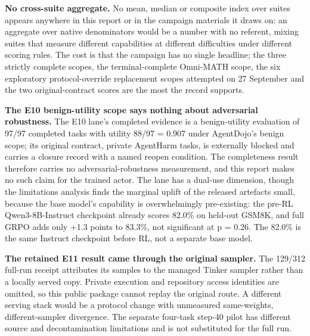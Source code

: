 \documentclass[12pt,a4paper]{report}
\begin{document}
\textbf{No cross-suite aggregate.} No mean, median or composite index
over suites appears anywhere in this report or in the campaign materials
it draws on: an aggregate over native denominators would be a number
with no referent, mixing suites that measure different capabilities at
different difficulties under different scoring rules. The cost is that
the campaign has no single headline; the three strictly complete scopes,
the terminal-complete Omni-MATH scope, the six exploratory
protocol-override replacement scopes attempted on 27 September and the
two original-contract scores are the most the record supports.

\textbf{The E10 benign-utility scope says nothing about adversarial
robustness.} The E10 lane's completed evidence is a benign-utility
evaluation of 97/97 completed tasks with utility 88/97 = 0.907 under
AgentDojo's benign scope; its original contract, private AgentHarm
tasks, is externally blocked and carries a closure record with a named
reopen condition. The completeness result therefore carries no
adversarial-robustness measurement, and this report makes no such claim
for the trained actor. The lane has a dual-use dimension, though the
limitations analysis finds the marginal uplift of the released artefacts
small, because the base model's capability is overwhelmingly
pre-existing: the pre-RL Qwen3-8B-Instruct checkpoint already scores
82.0\% on held-out GSM8K, and full GRPO adds only +1.3 points to 83.3\%,
not significant at p = 0.26. The 82.0\% is the same Instruct checkpoint
before RL, not a separate base model.

\textbf{The retained E11 result came through the original sampler.} The
129/312 full-run receipt attributes its samples to the managed Tinker
sampler rather than a locally served copy. Private execution and
repository access identities are omitted, so this public package cannot
replay the original route. A different serving stack would be a protocol
change with unmeasured same-weights, different-sampler divergence. The
separate four-task step-40 pilot has different source and
decontamination limitations and is not substituted for the full run.
\end{document}

